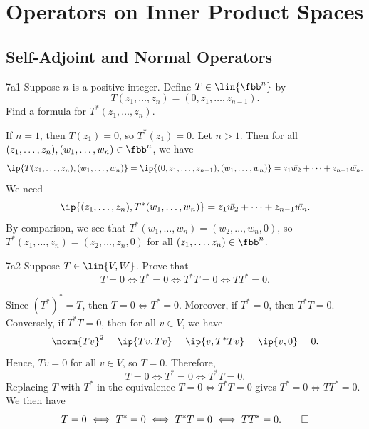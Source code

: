 \section{Operators on Inner Product Spaces}

\subsection{Self-Adjoint and Normal Operators}

\begin{exercise}{7a1}
    Suppose $n$ is a positive integer.
    Define $T \in \lin{\fbb^n}$ by
    \[
        T(z_1, \ldots, z_n) = (0, z_1, \ldots, z_{n-1}).
    \]
    Find a formula for $T^\ast(z_1, \ldots, z_n)$.
\end{exercise}

\begin{sol}
    If $n = 1$, then $T(z_1) = 0$, so $T^\ast(z_1) = 0$.
    Let $n > 1$.
    Then for all $(z_1, \ldots, z_n), (w_1, \ldots, w_n) \in \fbb^n$, we have
    \[
        \ip{T(z_1, \ldots, z_n), (w_1, \ldots, w_n)} = \ip{(0, z_1, \ldots, z_{n-1}), (w_1, \ldots, w_n)} = z_1\bar{w_2} + \cdots + z_{n-1}\bar{w_n}.
    \]
    We need
    \[
        \ip{(z_1, \ldots, z_n), T^\ast(w_1, \ldots, w_n)} = z_1\bar{w_2} + \cdots + z_{n-1}\bar{w_n}.
    \]
    By comparison, we see that $T^\ast(w_1, \ldots, w_n) = (w_2, \ldots, w_n, 0)$, so $T^\ast(z_1, \ldots, z_n) = (z_2, \ldots, z_n, 0)$ for all $(z_1, \ldots, z_n) \in \fbb^n$.
\end{sol}

\begin{exercise}{7a2}
    Suppose $T \in \lin{V, W}$.
    Prove that
    \[
        T = 0 \iff T^\ast = 0 \iff T^\ast T = 0 \iff TT^\ast = 0.
    \]
\end{exercise}

\begin{sol}
    Since $(T^\ast)^\ast = T$, then $T = 0 \iff T^\ast = 0$.
    Moreover, if $T^\ast = 0$, then $T^\ast T = 0$.
    Conversely, if $T^\ast T = 0$, then for all $v \in V$, we have
    \[
        \norm{Tv}^2 = \ip{Tv, Tv} = \ip{v, T^\ast Tv} = \ip{v, 0} = 0.
    \]
    Hence, $Tv = 0$ for all $v \in V$, so $T = 0$.
    Therefore,
    \[
        T = 0 \iff T^\ast = 0 \iff T^\ast T = 0.
    \]
    Replacing $T$ with $T^\ast$ in the equivalence $T = 0 \iff T^\ast T = 0$ gives $T^\ast = 0 \iff TT^\ast = 0$.
    We then have
    \[
        T = 0 \iff T^\ast = 0 \iff T^\ast T = 0 \iff TT^\ast = 0. \qedhere
    \]
\end{sol}

